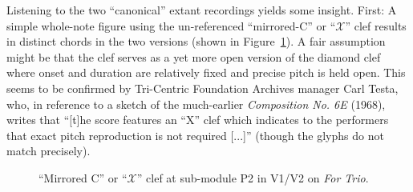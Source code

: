         Listening to the two ``canonical'' extant recordings yields some insight. First: A simple whole-note figure using the un-referenced ``mirrored-C'' or ``$\mathscr{X}$'' clef results in distinct chords in the two versions (shown in Figure~\ref{fig:mysteryclef}). A fair assumption might be that the clef serves as a yet more open version of the diamond clef where onset and duration are relatively fixed and precise pitch is held open. This seems to be confirmed by Tri-Centric Foundation Archives manager Carl Testa, who, in reference to a sketch of the much-earlier \textit{Composition No. 6E} (1968), writes that ``[t]he score features an ``X'' clef which indicates to the performers that exact pitch reproduction is not required [...]'' (though the glyphs do not match precisely).\autocite{Testa}

            \begin{figure}
                \centering
                \qquad
                \captionsetup{width=.55\textwidth}
                \caption[``Mirrored C'' or ``$\mathscr{X}$'' clef at sub-module P2 in V1/V2 on \textit{For Trio}.]{``Mirrored C'' or ``$\mathscr{X}$'' clef at sub-module P2 in V1/V2 on \textit{For Trio}.\footnotemark}%
                \label{fig:mysteryclef}%
            \end{figure}


